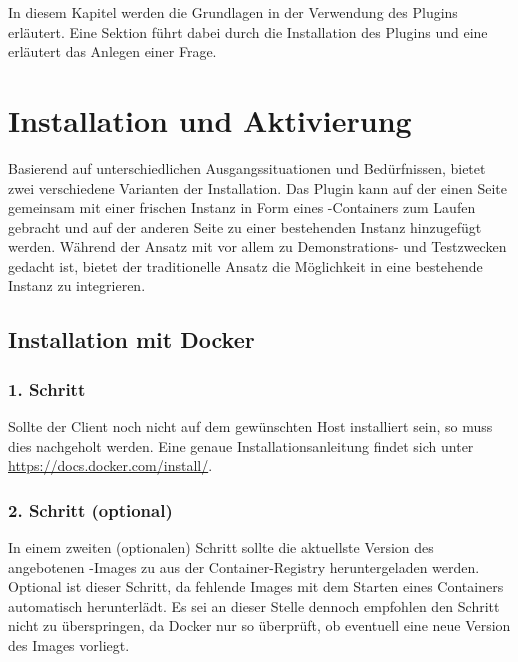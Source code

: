 In diesem Kapitel werden die Grundlagen in der Verwendung des Plugins erläutert. Eine Sektion führt dabei durch die Installation des Plugins und eine erläutert das Anlegen einer Frage.

\section{Installation und Aktivierung}
\label{sec:installation-und-aktivierung}

Basierend auf unterschiedlichen Ausgangssituationen und Bedürfnissen, bietet  zwei verschiedene Varianten der Installation. Das Plugin kann auf der einen Seite gemeinsam mit einer frischen  Instanz in Form eines -Containers zum Laufen gebracht und auf der anderen Seite zu einer bestehenden  Instanz hinzugefügt werden. Während der Ansatz mit  vor allem zu Demonstrations- und Testzwecken gedacht ist, bietet der traditionelle Ansatz die Möglichkeit  in eine bestehende  Instanz zu integrieren.

\subsection{Installation mit Docker}
\label{subsec:installation-mit-docker}

    \subsubsection{1. Schritt}
    
        Sollte der  Client noch nicht auf dem gewünschten Host installiert sein, so muss dies nachgeholt werden. Eine genaue Installationsanleitung findet sich unter \url{https://docs.docker.com/install/}.
    
    \subsubsection{2. Schritt (optional)}
    
        In einem zweiten (optionalen) Schritt sollte die aktuellste Version des angebotenen -Images zu  aus der Container-Registry heruntergeladen werden. Optional ist dieser Schritt, da  fehlende Images mit dem Starten eines Containers automatisch herunterlädt. Es sei an dieser Stelle dennoch empfohlen den Schritt nicht zu überspringen, da Docker nur so überprüft, ob eventuell eine neue Version des Images vorliegt.
        
